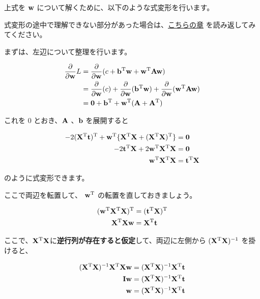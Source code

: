 上式を ${\bf w}$ について解くために、以下のような式変形を行います。

式変形の途中で理解できない部分があった場合は、\href{https://tutorials.chainer.org/ja/05_Basics_of_Linear_Algebra.html}{こちらの章} を読み返してみてください。

まずは、左辺について整理を行います。

\[
\begin{aligned}
\frac{\partial}{\partial {\bf w}} L
&= \frac{\partial}{\partial {\bf w}} (c + {\bf b}^{\rm T}{\bf w} + {\bf w}^{\rm T}{\bf A}{\bf w}) \\
&=\frac{\partial}{\partial {\bf w}} (c) + \frac{\partial}{\partial {\bf w}} ({\bf b}^{\rm T}{\bf w}) + \frac{\partial}{\partial {\bf w}} ({\bf w}^{\rm T}{\bf A}{\bf w}) \\
&={\bf 0} + {\bf b}^{\rm T} + {\bf w}^{\rm T}({\bf A} + {\bf A}^{\rm T})
\end{aligned}
\]


これを $0$ とおき、${\bf A}$ 、${\bf b}$ を展開すると


\[
\begin{aligned}
-2({\bf X}^{\rm T}{\bf t})^{\rm T} + {\bf w}^{\rm T} \{ {\bf X}^{\rm T}{\bf X} + ({\bf X}^{\rm T}{\bf X})^{\rm T} \}
&= {\bf 0} \\
-2{\bf t}^{\rm T}{\bf X} + 2{\bf w}^{\rm T}{\bf X}^{\rm T}{\bf X}
&= {\bf 0} \\
{\bf w}^{\rm T}{\bf X}^{\rm T}{\bf X}& = {\bf t}^{\rm T}{\bf X} \\
\end{aligned}
\]


のように式変形できます。


ここで両辺を転置して、 ${\bf w}^{\rm T}$ の転置を直しておきましょう。


\[
\begin{aligned}
({\bf w}^{\rm T}{\bf X}^{\rm T}{\bf X}) ^{\rm T} & = ({\bf t}^{\rm T}{\bf X}) ^{\rm T} \\
{\bf X}^{\rm T}{\bf X}{\bf w} & = {\bf X}^{\rm T}{\bf t} \\
\end{aligned}
\]


ここで、${\bf X}^{\rm T}{\bf X}$に\textbf{逆行列が存在すると仮定}して、両辺に左側から $({\bf X}^{\rm T}{\bf X})^{-1}$ を掛けると、


\[
\begin{aligned}
({\bf X}^{\rm T}{\bf X})^{-1} {\bf X}^{\rm T}{\bf X} {\bf w} &= ({\bf X}^{\rm T}{\bf X})^{-1} {\bf X}^{\rm T}{\bf t} \\
{\bf I}{\bf w} &= ({\bf X}^{\rm T}{\bf X})^{-1} {\bf X}^{\rm T}{\bf t} \\
{\bf w} &= ({\bf X}^{\rm T}{\bf X})^{-1}{\bf X}^{\rm T}{\bf t}
\end{aligned}
\]


